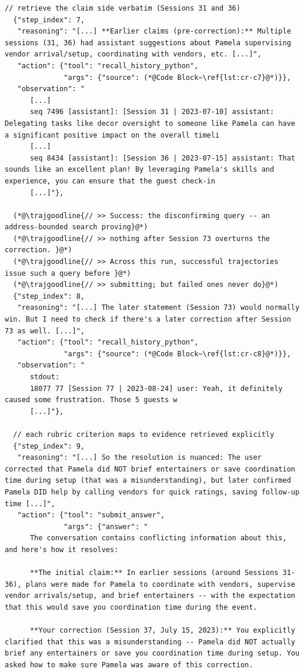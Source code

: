 \begin{lstlisting}[style=traj]
  // retrieve the claim side verbatim (Sessions 31 and 36)
  {"step_index": 7,
   "reasoning": "[...] **Earlier claims (pre-correction):** Multiple sessions (31, 36) had assistant suggestions about Pamela supervising vendor arrival/setup, coordinating with vendors, etc. [...]",
   "action": {"tool": "recall_history_python",
              "args": {"source": (*@Code Block~\ref{lst:cr-c7}@*)}},
   "observation": "
      [...]
      seq 7496 [assistant]: [Session 31 | 2023-07-10] assistant: Delegating tasks like decor oversight to someone like Pamela can have a significant positive impact on the overall timeli
      [...]
      seq 8434 [assistant]: [Session 36 | 2023-07-15] assistant: That sounds like an excellent plan! By leveraging Pamela's skills and experience, you can ensure that the guest check-in
      [...]"},

  (*@\trajgoodline{// >> Success: the disconfirming query -- an address-bounded search proving}@*)
  (*@\trajgoodline{// >> nothing after Session 73 overturns the correction. }@*)
  (*@\trajgoodline{// >> Across this run, successful trajectories issue such a query before }@*)
  (*@\trajgoodline{// >> submitting; but failed ones never do}@*)
  {"step_index": 8,
   "reasoning": "[...] The later statement (Session 73) would normally win. But I need to check if there's a later correction after Session 73 as well. [...]",
   "action": {"tool": "recall_history_python",
              "args": {"source": (*@Code Block~\ref{lst:cr-c8}@*)}},
   "observation": "
      stdout:
      18077 77 [Session 77 | 2023-08-24] user: Yeah, it definitely caused some frustration. Those 5 guests w
      [...]"},

  // each rubric criterion maps to evidence retrieved explicitly
  {"step_index": 9,
   "reasoning": "[...] So the resolution is nuanced: The user corrected that Pamela did NOT brief entertainers or save coordination time during setup (that was a misunderstanding), but later confirmed Pamela DID help by calling vendors for quick ratings, saving follow-up time [...]",
   "action": {"tool": "submit_answer",
              "args": {"answer": "
      The conversation contains conflicting information about this, and here's how it resolves:

      **The initial claim:** In earlier sessions (around Sessions 31-36), plans were made for Pamela to coordinate with vendors, supervise vendor arrivals/setup, and brief entertainers -- with the expectation that this would save you coordination time during the event.

      **Your correction (Session 37, July 15, 2023):** You explicitly clarified that this was a misunderstanding -- Pamela did NOT actually brief any entertainers or save you coordination time during setup. You asked how to make sure Pamela was aware of this correction.


\end{lstlisting}
